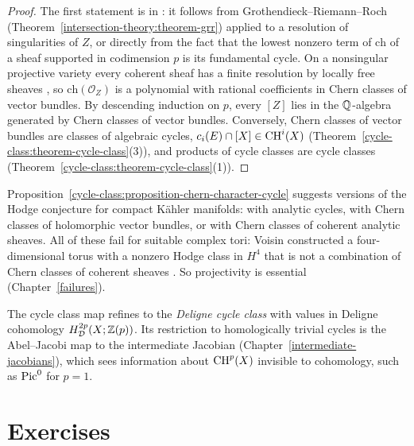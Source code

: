 \begin{proof}
The first statement is in \cite[Chapter 15]{fulton-intersection}: it follows from Grothendieck--Riemann--Roch (Theorem~\ref{intersection-theory:theorem-grr}) applied to a resolution
of singularities of $Z$, or directly from the fact that the lowest nonzero term of $\mathrm{ch}$ of a sheaf supported in codimension $p$ is its fundamental cycle. On a nonsingular projective
variety every coherent sheaf has a finite resolution by locally free sheaves \cite[Exercises III.6.8 and III.6.9]{hartshorne-ag}, so $\mathrm{ch}(\mathcal{O}_Z)$ is a polynomial with rational
coefficients in Chern classes of vector bundles. By descending induction on $p$, every $[Z]$ lies in the $\mathbb{Q}$-algebra generated by Chern classes of vector bundles. Conversely, Chern
classes of vector bundles are classes of algebraic cycles, $c_i(E) \cap [X] \in \operatorname{CH}^i(X)$ (Theorem~\ref{cycle-class:theorem-cycle-class}(3)), and products of cycle classes are cycle
classes (Theorem~\ref{cycle-class:theorem-cycle-class}(1)).
\end{proof}

\begin{remark}\label{cycle-class:remark-kahler-version}
Proposition~\ref{cycle-class:proposition-chern-character-cycle} suggests versions of the Hodge conjecture for compact K\"ahler manifolds: with analytic cycles, with Chern classes of
holomorphic vector bundles, or with Chern classes of coherent analytic sheaves. All of these fail for suitable complex tori: Voisin constructed a
four-dimensional torus with a nonzero Hodge class in $H^4$ that is not a combination of Chern classes of coherent sheaves \cite{voisin-2002}. So projectivity is essential
(Chapter~\ref{failures}).
\end{remark}

\begin{remark}\label{cycle-class:remark-deligne-cohomology}
The cycle class map refines to the \emph{Deligne cycle class} with values in Deligne cohomology $H^{2p}_{\mathcal{D}}(X; \mathbb{Z}(p))$. Its restriction to homologically trivial cycles is the
Abel--Jacobi map to the intermediate Jacobian (Chapter~\ref{intermediate-jacobians}), which sees information about $\operatorname{CH}^p(X)$ invisible to cohomology, such as $\operatorname{Pic}^0$ for $p = 1$.
\end{remark}

\section{Exercises}\label{cycle-class:section-exercises}

